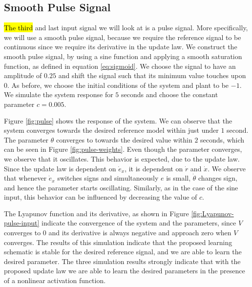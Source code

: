 \subsection{Smooth Pulse Signal}
\hl{The third} and last input signal we will look at is a pulse signal. More specifically, we will use a smooth pulse signal, because we require the reference signal to be continuous since we require its derivative in the update law. We construct the smooth pulse signal, by using a sine function and applying a smooth saturation function, as defined in equation \eqref{eq:sigmoid}. We choose the signal to have an amplitude of $0.25$ and shift the signal such that its minimum value touches upon $0$. As before, we choose the initial conditions of the system and plant to be $-1$. We simulate the system response for $5$ seconds and choose the constant parameter $c=0.005$.

Figure \ref{fig:pulse} shows the response of the system. We can observe that the system converges towards the desired reference model within just under $1$ second. The parameter $\theta$ converges to towards the desired value within $2$ seconds, which can be seen in Figure \ref{fig:pulse-weights}. Even though the parameter converges, we observe that it oscillates. This behavior is expected, due to the update law. Since the update law is dependent on $\dot e_x$, it is dependent on $\dot r$ and $\dot x$. We observe that whenever $\dot e_x$ switches signs and simultaneously $e$ is small, $\dot \theta$ changes sign, and hence the parameter starts oscillating. Similarly, as in the case of the sine input, this behavior can be influenced by decreasing the value of $c$.

The Lyapunov function and its derivative, as shown in Figure \ref{fig:Lyapunov-pulse-input} indicate the convergence of the system and the parameters, since $V$ converges to $0$ and its derivative is always negative and approach zero when $V$ converges. The results of this simulation indicate that the proposed learning schematic is stable for the desired reference signal, and we are able to learn the desired parameter. The three simulation results strongly indicate that with the proposed update law we are able to learn the desired parameters in the presence of a nonlinear activation function.

